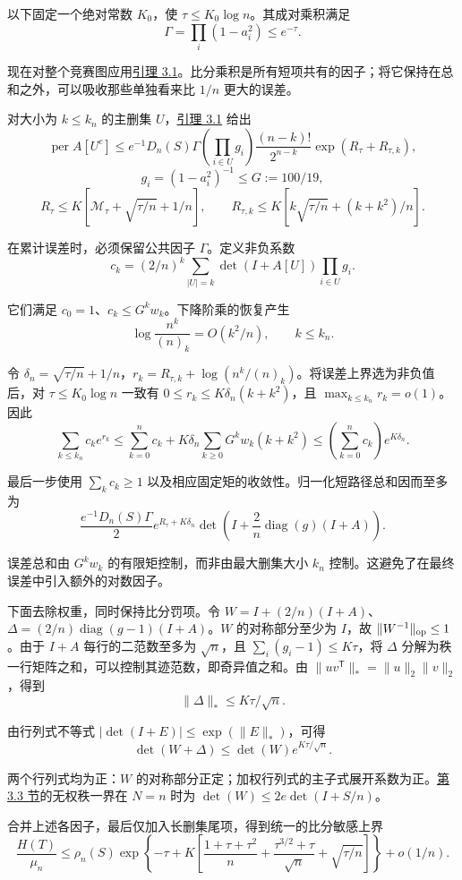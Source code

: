 \documentclass[11pt,a4paper]{article}
\newcommand{\paperref}[2]{\hyperref[#1]{#2}}
\begin{document}
以下固定一个绝对常数 \(K_0\)，使 \(\tau\le K_0\log n\)。其成对乘积满足
\[\Gamma=\prod_i(1-a_i^2)\le e^{-\tau}.\]

现在对整个竞赛图应用\paperref{thm-3.1}{引理 3.1}。比分乘积是所有短项共有的因子；将它保持在总和之外，可以吸收那些单独看来比 \(1/n\) 更大的误差。

对大小为 \(k\le k_n\) 的主删集 \(U\)，\paperref{thm-3.1}{引理 3.1} 给出
\[\operatorname{per}A[U^c]\le
e^{-1}D_n(S)\Gamma
\left(\prod_{i\in U}g_i\right)
\frac{(n-k)!}{2^{n-k}}\exp(R_\tau+R_{\tau,k}),\]
\nopagebreak[3]\[g_i=(1-a_i^2)^{-1}\le G:=100/19,\]
\nopagebreak[3]\[R_\tau\le K[\mathcal M_\tau+\sqrt{\tau/n}+1/n],\qquad
R_{\tau,k}\le K[k\sqrt{\tau/n}+(k+k^2)/n].\]

在累计误差时，必须保留公共因子 \(\Gamma\)。定义非负系数
\[c_k=(2/n)^k\sum_{|U|=k}\det(I+A[U])\prod_{i\in U}g_i.\]

它们满足 \(c_0=1\)、\(c_k\le G^kw_k\)。下降阶乘的恢复产生
\[\log\frac{n^k}{(n)_k}=O(k^2/n),\qquad k\le k_n.\]

令 \(\delta_n=\sqrt{\tau/n}+1/n\)，\(r_k=R_{\tau,k}+\log(n^k/(n)_k)\)。将误差上界选为非负值后，对 \(\tau\le K_0\log n\) 一致有 \(0\le r_k\le K\delta_n(k+k^2)\)，且 \(\max_{k\le k_n}r_k=o(1)\)。因此
\[\sum_{k\le k_n}c_ke^{r_k}
\le\sum_{k=0}^{n}c_k+
K\delta_n\sum_{k\ge0}G^kw_k(k+k^2)
\le\left(\sum_{k=0}^{n}c_k\right)e^{K\delta_n}.\]

最后一步使用 \(\sum_kc_k\ge1\) 以及相应固定矩的收敛性。归一化短路径总和因而至多为
\[\frac{e^{-1}D_n(S)\Gamma}{2}
e^{R_\tau+K\delta_n}
\det\left(I+\frac2n\operatorname{diag}(g)(I+A)\right).\]

误差总和由 \(G^kw_k\) 的有限矩控制，而非由最大删集大小 \(k_n\) 控制。这避免了在最终误差中引入额外的对数因子。

下面去除权重，同时保持比分罚项。令 \(W=I+(2/n)(I+A)\)、\(\Delta=(2/n)\operatorname{diag}(g-1)(I+A)\)。\(W\) 的对称部分至少为 \(I\)，故 \(\|W^{-1}\|_{\rm op}\le1\)。由于 \(I+A\) 每行的二范数至多为 \(\sqrt n\)，且 \(\sum_i(g_i-1)\le K\tau\)，将 \(\Delta\) 分解为秩一行矩阵之和，可以控制其迹范数，即奇异值之和。由 \(\|uv^{\mathsf T}\|_*=\|u\|_2\|v\|_2\)，得到
\[\|\Delta\|_*\le K\tau/\sqrt n.\]

由行列式不等式 \(|\det(I+E)|\le\exp(\|E\|_*)\)，可得
\[\det(W+\Delta)\le\det(W)e^{K\tau/\sqrt n}.\]

两个行列式均为正：\(W\) 的对称部分正定；加权行列式的主子式展开系数为正。\paperref{sec-3.3}{第 3.3 节}的无权秩一界在 \(N=n\) 时为 \(\det(W)\le2e\det(I+S/n)\)。

合并上述各因子，最后仅加入长删集尾项，得到统一的比分敏感上界
\begin{equation}
\frac{H(T)}{\mu_n}\le
\rho_n(S)\exp\left\{-\tau+
K\left[\frac{1+\tau+\tau^2}{n}
+\frac{\tau^{3/2}+\tau}{\sqrt n}+\sqrt{\tau/n}\right]\right\}
+o(1/n).
\tag{3.2}\label{eq-score-penalty}
\end{equation}
\end{document}

